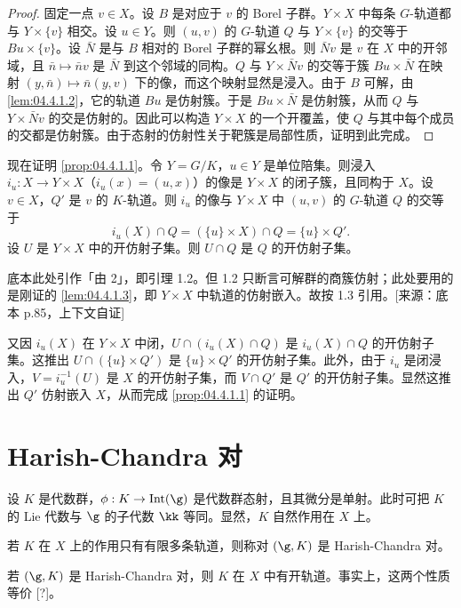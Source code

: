 \begin{proof}
固定一点 $v\in X$。设 $B$ 是对应于 $v$ 的 Borel 子群。$Y\times X$ 中每条 $G$-轨道都与 $Y\times\{v\}$ 相交。设 $u\in Y$。则 $(u,v)$ 的 $G$-轨道 $Q$ 与 $Y\times\{v\}$ 的交等于 $Bu\times\{v\}$。设 $\bar N$ 是与 $B$ 相对的 Borel 子群的幂幺根。则 $\bar Nv$ 是 $v$ 在 $X$ 中的开邻域，且 $\bar n\mapsto\bar nv$ 是 $\bar N$ 到这个邻域的同构。$Q$ 与 $Y\times\bar Nv$ 的交等于簇 $Bu\times\bar N$ 在映射 $(y,\bar n)\mapsto\bar n(y,v)$ 下的像，而这个映射显然是浸入。由于 $B$ 可解，由 \ref{lem:04.4.1.2}，它的轨道 $Bu$ 是仿射簇。于是 $Bu\times\bar N$ 是仿射簇，从而 $Q$ 与 $Y\times\bar Nv$ 的交是仿射的。因此可以构造 $Y\times X$ 的一个开覆盖，使 $Q$ 与其中每个成员的交都是仿射簇。由于态射的仿射性关于靶簇是局部性质，证明到此完成。
\end{proof}

现在证明 \ref{prop:04.4.1.1}。令 $Y=G/K$，$u\in Y$ 是单位陪集。则浸入 $i_u:X\to Y\times X$（$i_u(x)=(u,x)$）的像是 $Y\times X$ 的闭子簇，且同构于 $X$。设 $v\in X$，$Q'$ 是 $v$ 的 $K$-轨道。则 $i_u$ 的像与 $Y\times X$ 中 $(u,v)$ 的 $G$-轨道 $Q$ 的交等于
$$i_u(X)\cap Q=(\{u\}\times X)\cap Q=\{u\}\times Q'.$$
设 $U$ 是 $Y\times X$ 中的开仿射子集。则 $U\cap Q$ 是 $Q$ 的开仿射子集。
\begin{annote}
底本此处引作「由 2」，即引理 1.2。但 1.2 只断言可解群的商簇仿射；此处要用的是刚证的 \ref{lem:04.4.1.3}，即 $Y\times X$ 中轨道的仿射嵌入。故按 1.3 引用。[来源：底本 p.85，上下文自证]
\end{annote}
又因 $i_u(X)$ 在 $Y\times X$ 中闭，$U\cap(i_u(X)\cap Q)$ 是 $i_u(X)\cap Q$ 的开仿射子集。这推出 $U\cap(\{u\}\times Q')$ 是 $\{u\}\times Q'$ 的开仿射子集。此外，由于 $i_u$ 是闭浸入，$V=i_u^{-1}(U)$ 是 $X$ 的开仿射子集，而 $V\cap Q'$ 是 $Q'$ 的开仿射子集。显然这推出 $Q'$ 仿射嵌入 $X$，从而完成 \ref{prop:04.4.1.1} 的证明。

\section{Harish-Chandra 对}
\label{sec:04.4.2}

设 $K$ 是代数群，$\phi:K\to\operatorname{Int}(\g)$ 是代数群态射，且其微分是单射。此时可把 $K$ 的 Lie 代数与 $\g$ 的子代数 $\kk$ 等同。显然，$K$ 自然作用在 $X$ 上。

若 $K$ 在 $X$ 上的作用只有有限多条轨道，则称对 $(\g,K)$ 是 Harish-Chandra 对。

若 $(\g,K)$ 是 Harish-Chandra 对，则 $K$ 在 $X$ 中有开轨道。事实上，这两个性质等价 [?]。

